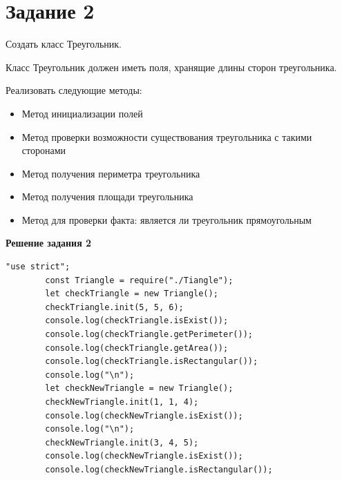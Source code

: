 \documentclass[12pt]{report}
\begin{document}
	\newpage
	\section{Задание 2}
	\noindent Создать класс Треугольник.\par
	\noindent Класс Треугольник должен иметь поля, хранящие длины сторон треугольника.\par
	\noindent Реализовать следующие методы:\par
	\begin{itemize}
		\item Метод инициализации полей
		\item Метод проверки возможности существования треугольника с такими сторонами
		\item Метод получения периметра треугольника
		\item Метод получения площади треугольника
		\item Метод для проверки факта: является ли треугольник прямоугольным
	\end{itemize}
	\noindent\textbf{Решение задания 2}
	\begin{lstlisting}[label=Task2.2,caption=Файл index.js]
		"use strict";
		const Triangle = require("./Tiangle");
		let checkTriangle = new Triangle();
		checkTriangle.init(5, 5, 6);
		console.log(checkTriangle.isExist());
		console.log(checkTriangle.getPerimeter());
		console.log(checkTriangle.getArea());
		console.log(checkTriangle.isRectangular());
		console.log("\n");
		let checkNewTriangle = new Triangle();
		checkNewTriangle.init(1, 1, 4);
		console.log(checkNewTriangle.isExist());
		console.log("\n");
		checkNewTriangle.init(3, 4, 5);
		console.log(checkNewTriangle.isExist());
		console.log(checkNewTriangle.isRectangular());
	\end{lstlisting}
\end{document}
